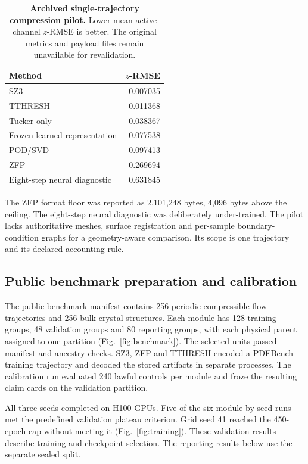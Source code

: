 \documentclass[10pt,a4paper,twocolumn]{article}
\begin{document}
\begin{table}[!t]
\caption{\textbf{Archived single-trajectory compression pilot.} Lower mean active-channel $z$-RMSE is better. The original metrics and payload files remain unavailable for revalidation.}
\label{tab:shock}
\centering\small
\begin{tabularx}{\columnwidth}{@{}Yr@{}}
\toprule
Method & $z$-RMSE\\
\midrule
SZ3 & 0.007035\\
TTHRESH & 0.011368\\
Tucker-only & 0.038367\\
Frozen learned representation & 0.077538\\
POD/SVD & 0.097413\\
ZFP & 0.269694\\
Eight-step neural diagnostic & 0.631845\\
\bottomrule
\end{tabularx}
\end{table}

The ZFP format floor was reported as 2,101,248 bytes, 4,096 bytes above the ceiling. The eight-step neural diagnostic was deliberately under-trained. The pilot lacks authoritative meshes, surface registration and per-sample boundary-condition graphs for a geometry-aware comparison. Its scope is one trajectory and its declared accounting rule.

\subsection{Public benchmark preparation and calibration}
The public benchmark manifest contains 256 periodic compressible flow trajectories and 256 bulk crystal structures. Each module has 128 training groups, 48 validation groups and 80 reporting groups, with each physical parent assigned to one partition (Fig.~\ref{fig:benchmark}). The selected units passed manifest and ancestry checks. SZ3, ZFP and TTHRESH encoded a PDEBench training trajectory and decoded the stored artifacts in separate processes. The calibration run evaluated 240 lawful controls per module and froze the resulting claim cards on the validation partition.

All three seeds completed on H100 GPUs. Five of the six module-by-seed runs met the predefined validation plateau criterion. Grid seed 41 reached the 450-epoch cap without meeting it (Fig.~\ref{fig:training}). These validation results describe training and checkpoint selection. The reporting results below use the separate sealed split.
\end{document}
